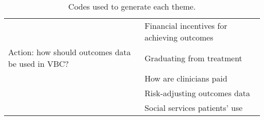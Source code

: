 \begin{table}[!htbp]
\begin{tabular}{l|l}
& Financial incentives for achieving outcomes \\
Action: how should outcomes data be used in VBC? & Graduating from treatment \\
& How are clinicians paid \\
& Risk-adjusting outcomes data \\
& Social services patients' use \\
\bottomrule
\end{tabular}
\caption{Codes used to generate each theme.}
\label{tab:appendix:codes}
\end{table}